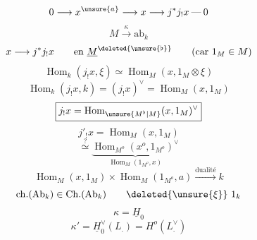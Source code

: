 \[
0\longrightarrow x^{\unsure{a}}\longrightarrow x\longrightarrow j^*j_!x\mathbin{\text{---}}0
\]
\[
M\xrightarrow{\kappa}\mathrm{ab}_k
\]
\[
x\longrightarrow j^*j_!x\qquad\text{en }\underline M^{\deleted{\unsure{\flat}}}
\qquad(\text{car }1_M\in M)
\]
\[
\operatorname{Hom}_k(j_!x,\xi)\simeq\operatorname{Hom}_M(x,1_M\otimes\xi)
\]
\[
\operatorname{Hom}_k(j_!x,k)=(j_!x)^\vee=\operatorname{Hom}_M(x,1_M)
\]
\[
\boxed{j_!x=\operatorname{Hom}_{\unsure{M^\flat|M}}(x,1_M)^\vee}
\]
\[
j'_!x=\operatorname{Hom}_M(x,1_M)
\]
\[
\overset{?}{\simeq}
\underbrace{\operatorname{Hom}_{M^o}(x^o,1_{M^o})^\vee}_{\operatorname{Hom}_M(1_{M^o},x)}
\]
\[
\operatorname{Hom}_M(x,1_M)\times\operatorname{Hom}_M(1_{M^o},a)
\xrightarrow{\text{dualité}}k
\]
\[
\mathrm{ch}.(\mathrm{Ab}_k)\in\mathrm{Ch}.(\mathrm{Ab}_k)
\qquad\deleted{\unsure{\xi}}\ 1_k
\]
\[
\kappa=\underline H_0
\]
\[
\kappa'=\underline H_0^\vee(L_.)=H^o(L_.^\vee)
\]
